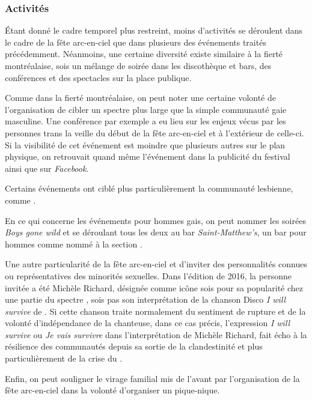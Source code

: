 \subsubsection{Activités}
\label{subsec:activitesfetearcenciel}
Étant donné le cadre temporel plus restreint, moins d'activités se déroulent dans le cadre de la fête arc-en-ciel que dans plusieurs des événements traités précédemment.
Néanmoins, une certaine diversité existe similaire à la fierté montréalaise, sois un mélange de soirée dans les discothèque et bars, des conférences et des spectacles sur la place publique.

Comme dans la fierté montréalaise, on peut noter une certaine volonté de l'organisation de cibler un spectre plus large que la simple communauté gaie masculine.
Une conférence par exemple a eu lieu sur les enjeux vécus par les personnes trans la veille du début de la fête arc-en-ciel et à l'extérieur de celle-ci.
Si la visibilité de cet événement est moindre que plusieurs autres sur le plan physique, on retrouvait quand même l'événement dans la publicité du festival ainsi que sur \emph{Facebook}.

Certains événements ont ciblé plus particulièrement la communauté lesbienne, comme .

En ce qui concerne les événements pour hommes gais, on peut nommer les soirées \emph{Boys gone wild} et  se déroulant tous les deux au bar \emph{Saint-Matthew's}, un bar pour hommes comme nommé à la section .

Une autre particularité de la fête arc-en-ciel et d'inviter des personnalités connues ou représentatives des minorités sexuelles.
Dans l'édition de 2016, la personne invitée a été Michèle Richard, désignée comme icône sois pour sa popularité chez une partie du spectre \lgbt{}, sois pas son interprétation de la chanson Disco \emph{I will survive} de .
Si cette chanson traite normalement du sentiment de rupture et de la volonté d'indépendance de la chanteuse, dans ce cas précis, l'expression \emph{I will survive} ou \emph{Je vais survivre} dans l'interprétation de Michèle Richard, fait écho à la résilience des communautés \lgbt depuis sa sortie de la clandestinité et plus particulièrement de la crise du \vih{}.

Enfin, on peut souligner le virage familial mis de l'avant par l'organisation de la fête arc-en-ciel dans la volonté d'organiser un pique-nique.


